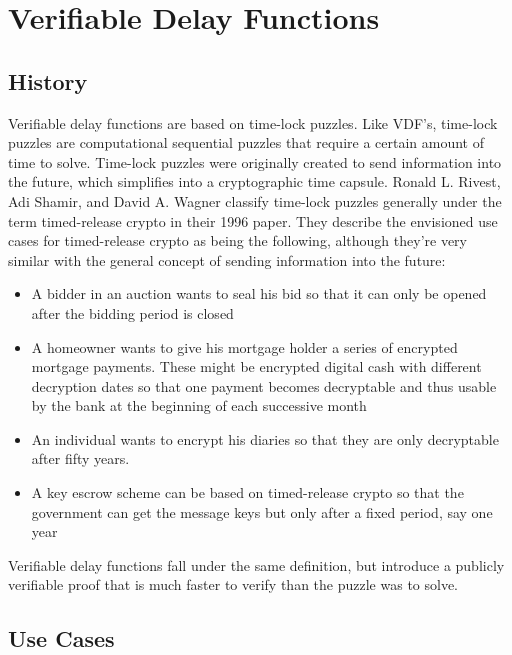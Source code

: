 \chapter{Verifiable Delay Functions}
\label{Verifiable Delay Functions}



\section{History}
Verifiable delay functions are based on time-lock puzzles. Like VDF's, time-lock puzzles are computational sequential puzzles that require a certain amount of time to solve.\cite{Rivest_undated-qr} Time-lock puzzles were originally created to send information into the future, which simplifies into a cryptographic time capsule. Ronald L. Rivest, Adi Shamir, and David A. Wagner classify time-lock puzzles generally under the term timed-release crypto in their 1996 paper. They describe the envisioned use cases for timed-release crypto as being the following, although they're very similar with the general concept of sending information into the future:

\begin{itemize}
  \item A bidder in an auction wants to seal his bid so that it can only be opened after the bidding period is closed 
  \item A homeowner wants to give his mortgage holder a series of encrypted mortgage payments. These might be encrypted digital cash with different decryption dates so that one payment becomes decryptable and thus usable by the bank at the beginning of each successive month
  \item An individual wants to encrypt his diaries so that they are only decryptable after fifty years.
  \item A key escrow scheme can be based on timed-release crypto so that the government can get the message keys but only after a fixed period, say one year
\end{itemize}

Verifiable delay functions fall under the same definition, but introduce a publicly verifiable proof that is much faster to verify than the puzzle was to solve.

\section{Use Cases}

